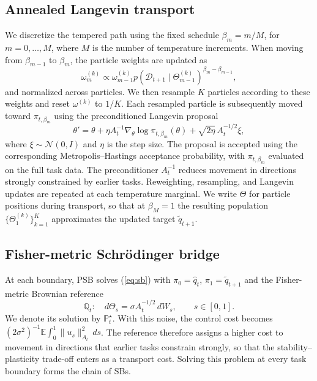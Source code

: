 \documentclass{article}
\begin{document}
\subsection{Annealed Langevin transport}
\label{sec:langevin}

We discretize the tempered path using the fixed schedule
  $\beta_m=m/M$, for $m=0,\ldots,M$, where $M$ is the number of temperature
  increments. When moving from
  $\beta_{m-1}$ to $\beta_m$, the particle weights are updated as
  \begin{equation}
      \omega_m^{(k)} \propto \omega_{m-1}^{(k)}
      p(\mathcal{D}_{t+1}\mid\Theta_{m-1}^{(k)})^{
      \beta_m-\beta_{m-1}},
      \label{eq:reweight}
  \end{equation}
  and normalized across particles. We then resample $K$ particles
  according to these weights and reset $\omega^{(k)}$ to $1/K$. Each
  resampled particle is subsequently moved toward
  $\pi_{t,\beta_m}$ using the preconditioned Langevin proposal
  \begin{equation}
      \theta'=\theta+\eta A_t^{-1}
      \nabla_\theta\log\pi_{t,\beta_m}(\theta)
      +\sqrt{2\eta}\,A_t^{-1/2}\xi,
      \label{eq:mala}
  \end{equation}
  where $\xi\sim\mathcal{N}(0,I)$ and $\eta$ is the step size. The
  proposal is accepted using the corresponding Metropolis--Hastings
  acceptance probability, with $\pi_{t,\beta_m}$ evaluated on the full
  task data. The preconditioner $A_t^{-1}$ reduces movement in
  directions strongly constrained by earlier tasks. Reweighting,
  resampling, and Langevin updates are repeated at each temperature
  marginal. We write $\Theta$ for particle positions during transport, so that
  at $\beta_M=1$ the resulting population $\{\Theta_1^{(k)}\}_{k=1}^{K}$
  approximates the updated target $\tilde q_{t+1}$.

\subsection{Fisher-metric Schr\"odinger bridge}
\label{sec:bridge}

At each boundary, PSB solves (\ref{eq:sb}) with $\pi_0=\hat q_t$,
$\pi_1=\tilde q_{t+1}$ and the Fisher-metric Brownian reference
\begin{equation}
    \mathbb{Q}_t:\quad d\Theta_s=\sigma A_t^{-1/2}\,dW_s,\qquad s\in[0,1].
    \label{eq:fisherreference}
\end{equation}
We denote its solution by $\mathbb{P}^\star_t$. With this noise, the control cost
becomes $(2\sigma^2)^{-1}\mathbb{E}\int_0^1\|u_s\|_{A_t}^2\,ds$. The reference
therefore assigns a higher cost to movement in directions that earlier tasks
constrain strongly, so that the stability--plasticity trade-off enters as a
transport cost. Solving this problem at every task boundary forms the chain of
SBs.
\end{document}
